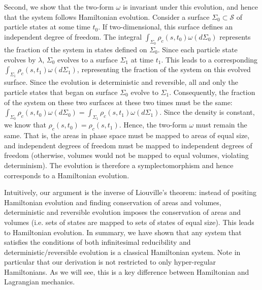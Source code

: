 \documentclass[12pt, twoside]{article}
\begin{document}
Second, we show that the two-form $\omega$ is invariant under this evolution, and hence that the system follows Hamiltonian evolution. Consider a surface $\Sigma_0 \subset \mathcal{S}$ of particle states at some time $t_0$. If two-dimensional, this surface defines an independent degree of freedom. The integral $\int_{\Sigma_0} \rho_c (s, t_0) \omega(d\Sigma_0)$ represents the fraction of the system in states defined on $\Sigma_0$. Since each particle state evolves by $\lambda$, $\Sigma_0$ evolves to a surface $\Sigma_1$ at time $t_1$. This leads to a corresponding $\int_{\Sigma_1} \rho_c (s, t_1) \omega(d\Sigma_1)$, representing the fraction of the system on this evolved surface. Since the evolution is deterministic and reversible, all and only the particle states that began on surface  $\Sigma_0$ evolve to $\Sigma_1$. Consequently, the fraction of the system on these two surfaces at these two times must be the same: $\int_{\Sigma_0} \rho_c (s, t_0) \omega(d\Sigma_0) = \int_{\Sigma_1} \rho_c (s, t_1) \omega(d\Sigma_1)$. Since the density is constant, we know that $\rho_c (s, t_0) = \rho_c (s, t_1)$. Hence, the two-form $\omega$ must remain the same. That is, the areas in phase space must be mapped to areas of equal size, and independent degrees of freedom must be mapped to independent degrees of freedom (otherwise, volumes would not be mapped to equal volumes, violating determinism). The evolution is therefore a symplectomorphism and hence corresponds to a Hamiltonian evolution. 

Intuitively, our argument is the inverse of Liouville's theorem: instead of positing Hamiltonian evolution and finding conservation of areas and volumes, deterministic and reversible evolution imposes the conservation of areas and volumes (i.e. sets of states are mapped to sets of states of equal size). This leads to Hamiltonian evolution. In summary, we have shown that any system that satisfies the conditions of both infinitesimal reducibility and deterministic/reversible evolution is a classical Hamiltonian system. Note in particular that our derivation is not restricted to only hyper-regular Hamiltonians. As we will see, this is a key difference between Hamiltonian and Lagrangian mechanics.
\end{document}
